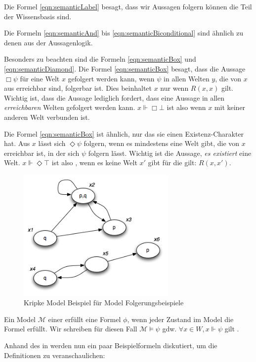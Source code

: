 Die Formel \eqref{eqn:semanticLabel} besagt, dass wir Aussagen folgern können die Teil der Wissensbasis sind.

Die Formeln \eqref{eqn:semanticAnd} bis \eqref{eqn:semanticBiconditional} sind ähnlich zu denen aus der Aussagenlogik.

Besonders zu beachten sind die Formeln \eqref{eqn:semanticBox} und \eqref{eqn:semanticDiamond}. 
Die Formel \eqref{eqn:semanticBox} besagt, dass die Aussage $\Box\psi$ für eine Welt $x$ gefolgert werden kann, wenn $\psi$ in allen Welten $y$, die von $x$ aus erreichbar sind, folgerbar ist. 
Dies beinhaltet $x$ nur wenn $R(x,x)$ gilt.
Wichtig ist, dass die Aussage lediglich fordert, dass eine Aussage in allen \emph{erreichbaren} Welten gefolgert werden kann. 
$x \Vdash \Box \bot$ ist also \true wenn $x$ mit keiner anderen Welt verbunden ist.

Die Formel \eqref{eqn:semanticBox} ist ähnlich, nur das sie einen Existenz-Charakter hat. 
Aus $x$ lässt sich $\Diamond \psi$ folgern, wenn es mindestens eine Welt gibt, die von $x$ erreichbar ist, in der sich $\psi$ folgern lässt. 
Wichtig ist die Aussage, \emph{es existiert} eine Welt. 
$x \Vdash \Diamond \top$ ist also \false, wenn es keine Welt $x'$ gibt für die gilt: $R(x,x')$.\\


\begin{figure}[h!]
	\centering
	\includegraphics[height=6.5cm]{Images/Kripke01.png}
	\caption{Kripke Model Beispiel für Model Folgerungsbeispiele}
	\label{fig:Kripke01}
\end{figure}


\begin{definition}
	\label{def:model_erfuellt}
	Ein Model $\mathcal{M}$ einer \ML erfüllt eine Formel $\phi$, wenn jeder Zustand im Model die Formel erfüllt.
	Wir schreiben für diesen Fall $\mathcal{M} \vDash \psi$ gdw. $\forall x \in W, x \Vdash \psi$ gilt .\\
\end{definition}
%
%
Anhand des \KMs in  werden nun ein paar Beispielformeln diskutiert, um die Definitionen zu veranschaulichen:

